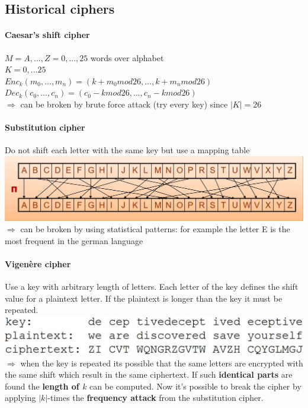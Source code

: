 \documentclass[12pt]{article}
\begin{document}
	\subsection{Historical ciphers}
	\paragraph{Caesar's shift cipher} $M = {A,...,Z} = {0,...,25}$ words over alphabet\\
	$K = {0,...25}$\\
	$Enc_k(m_0,...,m_n) = (k+m_0 mod 26,..., k+m_n mod 26)$\\
	$Dec_k(c_0,...,c_n) = (c_0-k mod 26,..., c_n-k mod 26)$\\
	$\Rightarrow$ can be broken by brute force attack (try every key) since $|K| = 26$
	\paragraph{Substitution cipher}
	Do not shift each letter with the same key but use a mapping table\\
	\includegraphics[width=\textwidth]{figures/substitution-cipher.JPG}\\
	$\Rightarrow$ can be broken by using statistical patterns: for example the letter E is the most frequent in the german language
	\paragraph{Vigenère cipher} Use a key with arbitrary length of letters. Each letter of the key defines the shift value for a plaintext letter. If the plaintext is longer than the key it must be repeated.\\
	\includegraphics[width=\textwidth]{figures/vigenere-cipher.JPG}\\
	$\Rightarrow$ when the key is repeated its possible that the same letters are encrypted with the same shift which result in the same ciphertext. If such \textbf{identical parts} are found the \textbf{length of $k$} can be computed. Now it's possible to break the cipher by applying $|k|$-times the \textbf{frequency attack} from the substitution cipher.
	
\end{document}
